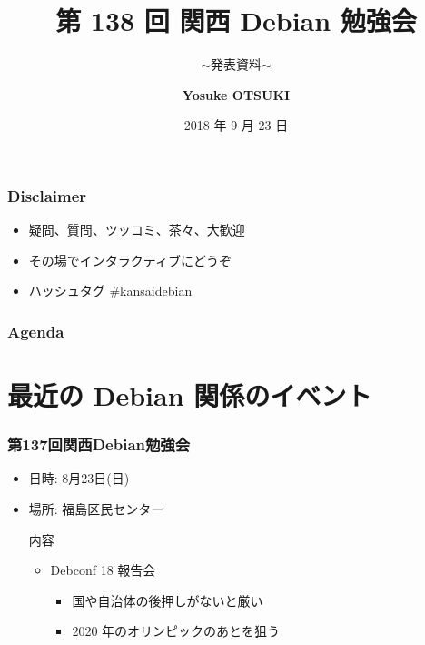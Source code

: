 \documentclass[cjk,dvipdfmx,10pt,compress,%
hyperref={bookmarks=true,bookmarksnumbered=true,bookmarksopen=false,%
colorlinks=false,%
pdftitle={第 132 回 関西 Debian 勉強会},%
pdfauthor={かわだ},%
pdfsubject={資料},%
}]{beamer}
\title{第 138 回 関西 Debian 勉強会}
\subtitle{$\sim$発表資料$\sim$}
\author[Yosuke OTSUKI]{{\large\bf Yosuke OTSUKI}}
\institute[Debian JP]{{\normalsize\tt 関西 Debian 勉強会}}
\date{{\small 2018 年 9 月 23 日}}
\begin{document}
\settitleslide
\begin{frame}
\titlepage
\end{frame}
\setdefaultslide

\begin{frame}[fragile]
  \frametitle{Disclaimer}
  \begin{itemize}
  \item 疑問、質問、ツッコミ、茶々、\alert{大歓迎}
  \item その場でインタラクティブにどうぞ
  \item ハッシュタグ \#kansaidebian
  \end{itemize}
\end{frame}

\begin{frame}[fragile]
\frametitle{Agenda}

\tableofcontents

\end{frame}

\section{最近の Debian 関係のイベント}

\begin{frame}[fragile]
  \frametitle{第137回関西Debian勉強会}
  \begin{itemize}
  \item 日時: 8月23日(日)
  \item 場所: 福島区民センター
  \begin{block}{内容}
    \begin{itemize}
    	\item Debconf 18 報告会
    	\begin{itemize}
			\item 国や自治体の後押しがないと厳い
			\item 2020 年のオリンピックのあとを狙う
    	\end{itemize}
    \end{itemize}
  \end{block}
\end{itemize}
\end{frame}
\end{document}

